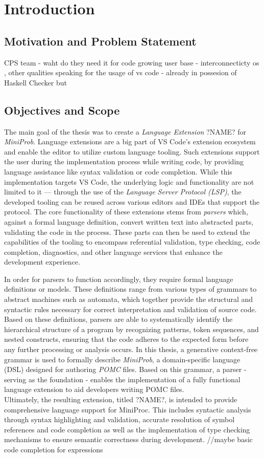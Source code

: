 \documentclass[11pt]{report}
\begin{document}
\chapter{Introduction}
\section{Motivation and Problem Statement}

CPS team - waht do they need it for
code growing user base - interconnecticty os , other qualities speaking for the usage of vs code
-
already in possesion of Haskell Checker but

\section{Objectives and Scope}
The main goal of the thesis was to create a \textit{Language Extension} ?NAME? for \textit{MiniProb}. Language extensions are a big part of
VS Code’s extension ecosystem and enable the editor to utilize custom language tooling. Such extensions support the user during the implementation process
while writing code, by providing language assistance like syntax validation or code completion. While this implementation targets VS Code, the underlying
logic and functionality are not limited to it — through the use of the \textit{Language Server Protocol (LSP)}, the developed tooling can be reused across
various editors and IDEs that support the protocol. The core functionality of these extensions stems from \textit{parsers} which, against a formal language
definition, convert written text into abstracted parts, validating the code in the process. These parts can then be used to extend the capabilities of the
tooling to encompass referential validation, type checking, code completion, diagnostics, and other language services that enhance the development experience.

In order for parsers to function accordingly, they require formal language definitions or models. These definitions range from various types of grammars to
abstract machines such as automata, which together provide the structural and syntactic rules necessary for correct interpretation and validation of source code.
Based on these definitions, parsers are able to systematically identify the hierarchical structure of a program by recognizing patterns, token sequences, and nested
constructs, ensuring that the code adheres to the expected form before any further processing or analysis occurs.
In this thesis, a generative context-free grammar is used to formally describe \textit{MiniProb}, a domain-specific language (DSL) designed for authoring \textit{POMC} files.
Based on this grammar, a parser - serving as the foundation - enables the implementation of a fully functional language extension to aid developers writing POMC files.\\
Ultimately, the resulting extension, titled ?NAME?, is intended to provide comprehensive language support for MiniProc. This includes syntactic analysis
through syntax highlighting and validation, accurate resolution of symbol references and code completion as well as the implementation of type checking mechanisms
to ensure semantic correctness during development. //maybe basic code completion for expressions
\end{document}

